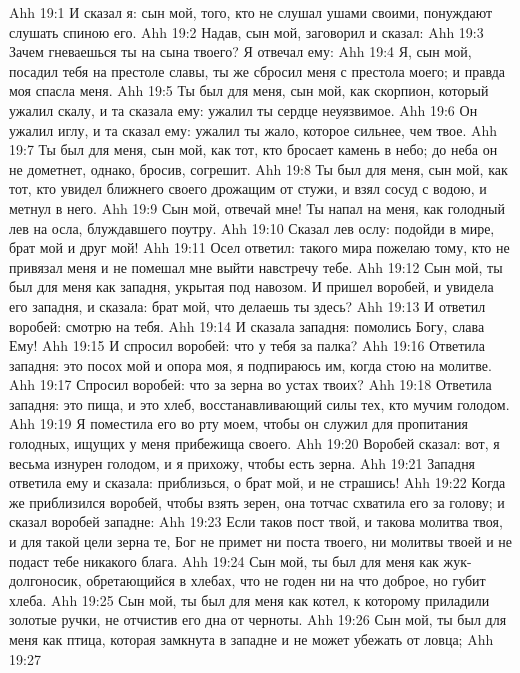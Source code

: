 \vs Ahh 19:1
И сказал я: сын мой, того, кто не слушал ушами своими, понуждают слушать спиною его.
\vs Ahh 19:2
Надав, сын мой, заговорил и сказал:
\vs Ahh 19:3
Зачем гневаешься ты на сына твоего? Я отвечал ему:
\vs Ahh 19:4
Я, сын мой, посадил тебя на престоле славы, ты же сбросил меня с престола моего; и правда моя спасла меня.
\vs Ahh 19:5
Ты был для меня, сын мой, как скорпион, который ужалил скалу, и та сказала ему: ужалил ты сердце неуязвимое.
\vs Ahh 19:6
Он ужалил иглу, и та сказал ему: ужалил ты жало, которое сильнее, чем твое.
\vs Ahh 19:7
Ты был для меня, сын мой, как тот, кто бросает камень в небо; до неба он не дометнет, однако, бросив, согрешит.
\vs Ahh 19:8
Ты был для меня, сын мой, как тот, кто увидел ближнего своего дрожащим от стужи, и взял сосуд с водою, и метнул в него.
\vs Ahh 19:9
Сын мой, отвечай мне! Ты напал на меня, как голодный лев на осла, блуждавшего поутру.
\vs Ahh 19:10
Сказал лев ослу: подойди в мире, брат мой и друг мой!
\vs Ahh 19:11
Осел ответил: такого мира пожелаю тому, кто не привязал меня и не помешал мне выйти навстречу тебе.
\vs Ahh 19:12
Сын мой, ты был для меня как западня, укрытая под навозом. И пришел воробей, и увидела его западня, и сказала: брат мой, что делаешь ты здесь?
\vs Ahh 19:13
И ответил воробей: смотрю на тебя.
\vs Ahh 19:14
И сказала западня: помолись Богу, слава Ему!
\vs Ahh 19:15
И спросил воробей: что у тебя за палка?
\vs Ahh 19:16
Ответила западня: это посох мой и опора моя, я подпираюсь им, когда стою на молитве.
\vs Ahh 19:17
Спросил воробей: что за зерна во устах твоих?
\vs Ahh 19:18
Ответила западня: это пища, и это хлеб, восстанавливающий силы тех, кто мучим голодом.
\vs Ahh 19:19
Я поместила его во рту моем, чтобы он служил для пропитания голодных, ищущих у меня прибежища своего.
\vs Ahh 19:20
Воробей сказал: вот, я весьма изнурен голодом, и я прихожу, чтобы есть зерна.
\vs Ahh 19:21
Западня ответила ему и сказала: приблизься, о брат мой, и не страшись!
\vs Ahh 19:22
Когда же приблизился воробей, чтобы взять зерен, она тотчас схватила его за голову; и сказал воробей западне:
\vs Ahh 19:23
Если таков пост твой, и такова молитва твоя, и для такой цели зерна те, Бог не примет ни поста твоего, ни молитвы твоей и не подаст тебе никакого блага.
\vs Ahh 19:24
Сын мой, ты был для меня как жук-долгоносик, обретающийся в хлебах, что не годен ни на что доброе, но губит хлеба.
\vs Ahh 19:25
Сын мой, ты был для меня как котел, к которому приладили золотые ручки, не отчистив его дна от черноты.
\vs Ahh 19:26
Сын мой, ты был для меня как птица, которая замкнута в западне и не может убежать от ловца;
\vs Ahh 19:27
